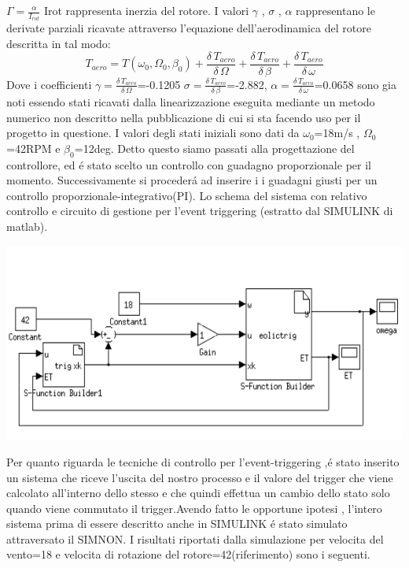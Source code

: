 \documentclass[a4paper,13pt]{article}
\begin{document}
$\Gamma=\frac{\alpha}{I_{rot}}$
Irot rappresenta inerzia del rotore.
I valori $\gamma$ , $\sigma$ , $\alpha$ rappresentano le derivate parziali ricavate attraverso 
l'equazione dell'aerodinamica del rotore descritta in tal modo:
\begin{equation}
T_{aero}=T(\omega_0,\Omega_0,\beta_0)+\frac{\delta \, T_{aero}}{\delta \, \Omega}+
\frac{\delta \, T_{aero}}{\delta \, \beta}+\frac{\delta \, T_{aero}}{\delta \, \omega}
\end{equation} 
Dove i coefficienti $\gamma=\frac{\delta \, T_{aero}}{\delta \, \Omega}$=-0.1205
$\sigma=\frac{\delta \, T_{aero}}{\delta \, \beta}$=-2.882,
$\alpha=\frac{\delta \, T_{aero}}{\delta \, \omega}$=0.0658
sono gia noti essendo stati ricavati dalla linearizzazione eseguita mediante un metodo numerico non descritto nella pubblicazione di cui si sta facendo uso per il progetto in questione.
I valori degli stati iniziali sono dati da $\omega_0$=18m/s , $\Omega_0$=42RPM e $\beta_0$=12deg.
Detto questo siamo passati alla progettazione del controllore, ed \'e stato scelto un controllo con guadagno proporzionale per il momento.
Successivamente si proceder\'a ad inserire i i guadagni giusti per un controllo proporzionale-integrativo(PI).
Lo schema del sistema con relativo controllo e circuito di gestione per l'event triggering (estratto dal SIMULINK di matlab).
\begin{center}
\includegraphics[scale=0.6]{schema1.png}
\end{center}
Per quanto riguarda le tecniche di controllo per l'event-triggering ,\'e stato inserito un sistema che riceve l'uscita del nostro processo e il valore del trigger che viene calcolato all'interno dello stesso e che quindi effettua un cambio dello stato solo quando viene commutato il trigger.Avendo fatto le opportune ipotesi , l'intero sistema prima di essere descritto anche in SIMULINK \'e stato simulato attraversato il SIMNON.
I risultati riportati dalla simulazione per velocita del vento=18 e velocita di rotazione del rotore=42(riferimento) sono i seguenti.
\end{document}
